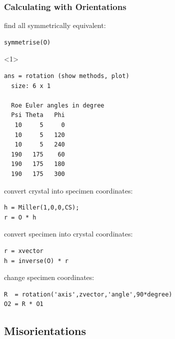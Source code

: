\begin{frame}
  \frametitle{Calculating with Orientations}

  find all symmetrically equivalent:
\begin{lstlisting}
symmetrise(O)
\end{lstlisting}
  \begin{onlyenv}<1>
\begin{lstlisting}[style=output]
ans = rotation (show methods, plot)
  size: 6 x 1

  Roe Euler angles in degree
  Psi Theta   Phi
   10     5     0
   10     5   120
   10     5   240
  190   175    60
  190   175   180
  190   175   300
\end{lstlisting}
  \end{onlyenv}


  \pause
  \medskip

  convert crystal into specimen coordinates:
\begin{lstlisting}
h = Miller(1,0,0,CS);
r = O * h
\end{lstlisting}

  \pause
  \medskip

  convert specimen into crystal coordinates:
\begin{lstlisting}
r = xvector
h = inverse(O) * r
\end{lstlisting}

  \pause
  \medskip

  change specimen coordinates:
  \begin{lstlisting}
R  = rotation('axis',zvector,'angle',90*degree)
O2 = R * O1
\end{lstlisting}

\end{frame}


\subsection*{Misorientations}
\label{sec:orientations}

